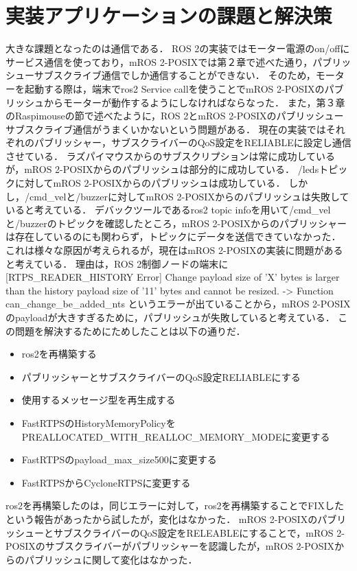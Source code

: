 \section{実装アプリケーションの課題と解決策}
大きな課題となったのは通信である．
ROS 2の実装ではモーター電源のon/offにサービス通信を使っており，mROS 2-POSIXでは第２章で述べた通り，パブリッシューサブスクライブ通信でしか通信することができない．
そのため，モーターを起動する際は，端末でros2 Service callを使うことでmROS 2-POSIXのパブリッシュからモーターが動作するようにしなければならなった．
また，第３章のRaspimouseの節で述べたように，ROS 2とmROS 2-POSIXのパブリッシューサブスクライブ通信がうまくいかないという問題がある．
現在の実装ではそれぞれのパブリッシャー，サブスクライバーのQoS設定をRELIABLEに設定し通信させている．
ラズパイマウスからのサブスクリプションは常に成功しているが，mROS 2-POSIXからのパブリッシュは部分的に成功している．
/ledsトピックに対してmROS 2-POSIXからのパブリッシュは成功している．
しかし，/cmd\_velと/buzzerに対してmROS 2-POSIXからのパブリッシュは失敗していると考えている．
デバックツールであるros2 topic infoを用いて/cmd\_velと/buzzerのトピックを確認したところ，mROS 2-POSIXからのパブリッシャーは存在しているのにも関わらず，トピックにデータを送信できていなかった．
これは様々な原因が考えられるが，現在はmROS 2-POSIXの実装に問題があると考えている．
理由は，ROS 2制御ノードの端末に [RTPS\_READER\_HISTORY Error] Change payload size of 'X' bytes is larger than the history payload size of '11' bytes and cannot be resized. -> Function can\_change\_be\_added\_nts
というエラーが出ていることから，mROS 2-POSIXのpayloadが大きすぎるために，パブリッシュが失敗していると考えている．
この問題を解決するためにためしたことは以下の通りだ．
\begin{itemize}
    \item ros2を再構築する
    \item パブリッシャーとサブスクライバーのQoS設定RELIABLEにする
    \item 使用するメッセージ型を再生成する
    \item FastRTPSのHistoryMemoryPolicyをPREALLOCATED\_WITH\_REALLOC\_MEMORY\_MODEに変更する
    \item FastRTPSのpayload\_max\_size500に変更する
    \item FastRTPSからCycloneRTPSに変更する
\end{itemize}
ros2を再構築したのは，同じエラーに対して，ros2を再構築することでFIXしたという報告があったから試したが，変化はなかった．
mROS 2-POSIXのパブリッシューとサブスクライバーのQoS設定をRELEABLEにすることで，mROS 2-POSIXのサブスクライバーがパブリッシャーを認識したが，mROS 2-POSIXからのパブリッシュに関して変化はなかった．
